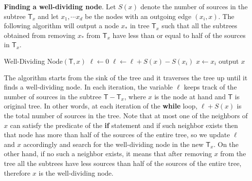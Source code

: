 \documentclass{article}
\def\A{{\sf A}}
\newcommand{\T}{{\mathsf T}}
\begin{document}
\noindent \textbf{Finding a well-dividing node}.
Let $S(x)$ denote the number of sources in the subtree $\T_x$ and let $x_1, \cdots x_d$  be the nodes with an outgoing edge $(x_i,x)$. The following algorithm will output a node $x_*$ in tree $\T_x$ such that  all the subtrees obtained from removing $x_*$ from $\T_x$ have less than or equal to half of the sources in $\T_x$.

\hspace{2mm}
\begin{algorithmic}
\State Well-Dividing Node$(\T,x)$
\State $\ell \gets 0$ 
 	   \State $\ell\gets \ell+S(x)-S(x_i)$ 
 	   \State $x \gets x_i$
	\Else
	\EndIf
\EndWhile
\State output $x$
\end{algorithmic}
\hspace{1mm}

The algorithm starts from the sink of the tree and it traverses the tree up until it finds a well-dividing node. In each iteration, the variable $\ell$ keeps track of the number of sources in the subtree $\T-\T_x$, where $x$ is the node at hand and $\T$ is original tree. In other words, at each iteration of the \textbf{while} loop, $\ell + S(x)$ is the total number of sources in the tree. Note that at most one of the neighbors of $x$ can satisfy the predicate of the \textbf{if} statement and if such neighbor exists then that node has more than half of the sources of the entire tree, so we update $\ell$ and $x$ accordingly and search for the well-dividing node in the new $\T_x$. On the other hand, if no such a neighbor exists, it means that after removing $x$ from the tree all the subtrees have less sources than half of the sources of the entire tree, therefore $x$ is the well-dividing node. 

\end{document}
